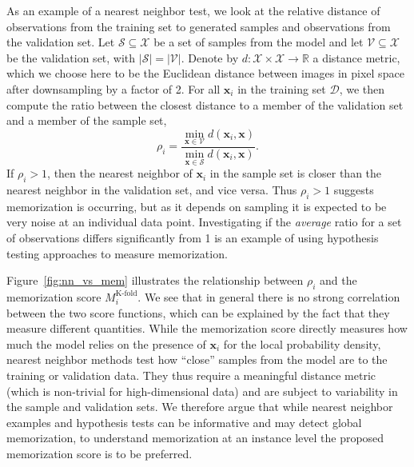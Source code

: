 \documentclass{article}
\newcommand{\bft}[1]{\mathbf{#1}}
\newcommand{\abs}[1]{\left|#1\right|}
\begin{document}
As an example of a nearest neighbor test, we look at the relative distance of 
observations from the training set to generated samples and observations from 
the validation set. Let $\mathcal{S} \subseteq \mathcal{X}$ be a set of 
samples from the model and let $\mathcal{V} \subseteq \mathcal{X}$ be the 
validation set, with $\abs{\mathcal{S}} = \abs{\mathcal{V}}$.  Denote by $d : 
\mathcal{X} \times \mathcal{X} \rightarrow \mathbb{R}$ a distance metric, 
which we choose here to be the Euclidean distance between images in pixel 
space after downsampling by a factor of 2. For all $\bft{x}_i$ in the training 
set $\mathcal{D}$, we then compute the ratio between the closest distance to a 
member of the validation set and a member of the sample set,
\begin{equation}
	\label{eq:nn_ratio}
	\rho_i = \frac{\min_{\bft{x} \in \mathcal{V}} d(\bft{x}_i, 
		\bft{x})}{\min_{\bft{x} \in \mathcal{S}} d(\bft{x}_i, 
		\bft{x})}.
\end{equation}
If $\rho_i > 1$, then the nearest neighbor of $\bft{x}_i$ in the sample set is 
closer than the nearest neighbor in the validation set, and vice versa. Thus 
$\rho_i > 1$ suggests memorization is occurring, but as it depends on sampling 
it is expected to be very noise at an individual data point. Investigating if 
the \emph{average} ratio for a set of observations differs significantly from 
1 is an example of using hypothesis testing approaches to measure 
memorization.

Figure~\ref{fig:nn_vs_mem} illustrates the relationship between $\rho_i$ and 
the memorization score $M^{\text{K-fold}}_i$. We see that in general there is 
no strong correlation between the two score functions, which can be explained 
by the fact that they measure different quantities. While the memorization 
score directly measures how much the model relies on the presence of 
$\bft{x}_i$ for the local probability density, nearest neighbor methods test 
how ``close'' samples from the model are to the training or validation data.  
They thus require a meaningful distance metric (which is non-trivial for 
high-dimensional data) and are subject to variability in the sample and 
validation sets.  We therefore argue that while nearest neighbor examples and 
hypothesis tests can be informative and may detect global memorization, to 
understand memorization at an instance level the proposed memorization score 
is to be preferred.
\end{document}
